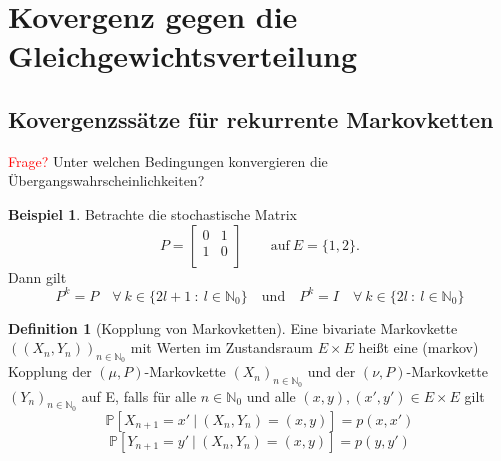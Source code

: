 \documentclass[a4paper,12pt]{scrartcl}
\theoremstyle{definition}
\newtheorem{bsp}{Beispiel}[section]
\newtheorem{defi}{Definition}[section]
\begin{document}
\section{Kovergenz gegen die Gleichgewichtsverteilung}
\subsection{Kovergenzssätze für rekurrente Markovketten}
\textcolor{red}{Frage?} Unter welchen Bedingungen konvergieren die Übergangswahrscheinlichkeiten?
\begin{bsp}
Betrachte die stochastische Matrix
\begin{equation*}
P=
\begin{bmatrix}
0 & 1 \\
1  & 0 \\
\end{bmatrix}
\qquad
\mathrm{auf \:} E = \lbrace 1,2 \rbrace.
\end{equation*}
Dann gilt
\begin{equation*}
P^{k} = P \quad \forall \: k \in \lbrace 2l +1 \: : \: l \in \mathbb{N}_{0}  \rbrace \quad \mathrm{und} \quad P^{k} = I \quad \forall \: k \in \lbrace 2l \: : \: l \in \mathbb{N}_{0} \rbrace
\end{equation*}
\end{bsp}
\clearpairofpagestyles
\ohead{\pagemark}
\pagestyle{scrheadings}
\begin{defi}[Kopplung von Markovketten]
Eine bivariate Markovkette $((X_{n},Y_{n}))_{n \in \mathbb{N}_{0}}$ mit Werten im Zustandsraum $E \times E$ heißt eine (markov) Kopplung der $(\mu,P)$-Markovkette $(X_{n})_{n \in \mathbb{N}_{0}}$ und der $(\nu,P)$-Markovkette $(Y_{n})_{n \in \mathbb{N}_{0}}$ auf E, falls für alle $n \in \mathbb{N}_{0}$ und alle $(x,y),(x',y') \in E \times E$ gilt
\begin{equation*}
\mathbb{P}[X_{n+1}= x' \: | \: (X_{n},Y_{n}) = (x,y)] = p(x,x')
\end{equation*}
\begin{equation*}
\mathbb{P}[Y_{n+1}= y' \: | \: (X_{n},Y_{n}) = (x,y)] = p(y,y')
\end{equation*}
\end{defi}
\end{document}
